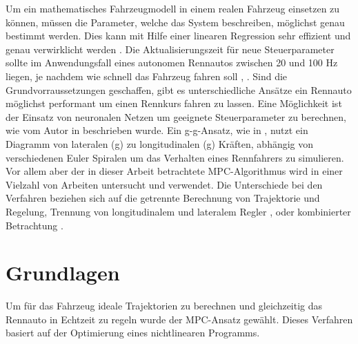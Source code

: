 \documentclass{like}
\begin{document}
Um ein mathematisches Fahrzeugmodell in einem realen Fahrzeug einsetzen zu können, müssen die Parameter, welche das System beschreiben, möglichst genau bestimmt werden. Dies kann mit Hilfe einer linearen Regression sehr effizient und genau verwirklicht werden \cite{Williams2016AggressiveDW}. Die Aktualisierungszeit für neue Steuerparameter sollte im Anwendungsfall eines autonomen Rennautos zwischen 20 und 100 Hz liegen, je nachdem wie schnell das Fahrzeug fahren soll \cite{rc_car_1_43}, \cite{Williams2016AggressiveDW}. 
\newline
Sind die Grundvorraussetzungen geschaffen, gibt es unterschiedliche Ansätze ein Rennauto möglichst performant um einen Rennkurs fahren zu lassen. Eine Möglichkeit ist der Einsatz von neuronalen Netzen um geeignete Steuerparameter zu berechnen, wie vom Autor in \cite{6374146} beschrieben wurde. 
Ein \glqq g-g\grqq-Ansatz, wie in \cite{KRITAYAKIRANA2010548}, nutzt ein Diagramm von lateralen (g) zu longitudinalen (g) Kräften, abhängig von verschiedenen Euler Spiralen um das Verhalten eines Rennfahrers zu simulieren. Vor allem aber der in dieser Arbeit betrachtete \ac{MPC}-Algorithmus wird in einer Vielzahl von Arbeiten untersucht und verwendet. 
Die Unterschiede bei den Verfahren beziehen sich auf die getrennte Berechnung von Trajektorie und Regelung, Trennung von longitudinalem und lateralem Regler \cite{MPC_Dynamic}, \cite{MPC_Dynamic_Tire_Model} oder kombinierter Betrachtung \cite{rc_car_1_43}.


\chapter{Grundlagen}
Um für das Fahrzeug ideale Trajektorien zu berechnen und gleichzeitig das Rennauto in Echtzeit zu regeln wurde der \ac{MPC}-Ansatz gewählt. Dieses Verfahren basiert auf der Optimierung eines nichtlinearen Programms.
 
\end{document}
